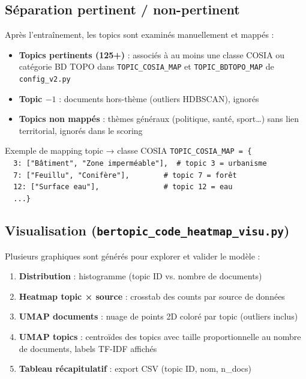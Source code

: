 \documentclass[11pt,a4paper]{report}
\newcommand{\code}[1]{\texttt{\small #1}}
\newcommand{\bdtopo}{\textsc{BD TOPO}}
\begin{document}
\subsection{Séparation pertinent / non-pertinent}

Après l'entraînement, les topics sont examinés manuellement et mappés :

\begin{itemize}
  \item \textbf{Topics pertinents (125+)} : associés à au moins une classe COSIA ou catégorie \bdtopo{} dans \code{TOPIC\_COSIA\_MAP} et \code{TOPIC\_BDTOPO\_MAP} de \code{config\_v2.py}
  \item \textbf{Topic $-1$} : documents hors-thème (outliers HDBSCAN), ignorés
  \item \textbf{Topics non mappés} : thèmes généraux (politique, santé, sport…) sans lien territorial, ignorés dans le scoring
\end{itemize}

\begin{infobox}{Exemple de mapping topic → classe COSIA}
\small
\code{TOPIC\_COSIA\_MAP = \{}\\
\code{\ \ 3: ["Bâtiment", "Zone imperméable"],\ \ \# topic 3 = urbanisme}\\
\code{\ \ 7: ["Feuillu", "Conifère"],\ \ \ \ \ \ \ \ \# topic 7 = forêt}\\
\code{\ \ 12: ["Surface eau"],\ \ \ \ \ \ \ \ \ \ \ \ \ \ \ \# topic 12 = eau}\\
\code{\ \ ...\}}
\end{infobox}

\subsection{Visualisation (\code{bertopic\_code\_heatmap\_visu.py})}

Plusieurs graphiques sont générés pour explorer et valider le modèle :

\begin{enumerate}
  \item \textbf{Distribution} : histogramme (topic ID vs. nombre de documents)
  \item \textbf{Heatmap topic × source} : crosstab des counts par source de données
  \item \textbf{UMAP documents} : nuage de points 2D coloré par topic (outliers inclus)
  \item \textbf{UMAP topics} : centroïdes des topics avec taille proportionnelle au nombre de documents, labels TF-IDF affichés
  \item \textbf{Tableau récapitulatif} : export CSV (topic ID, nom, n\_docs)
\end{enumerate}
\end{document}
